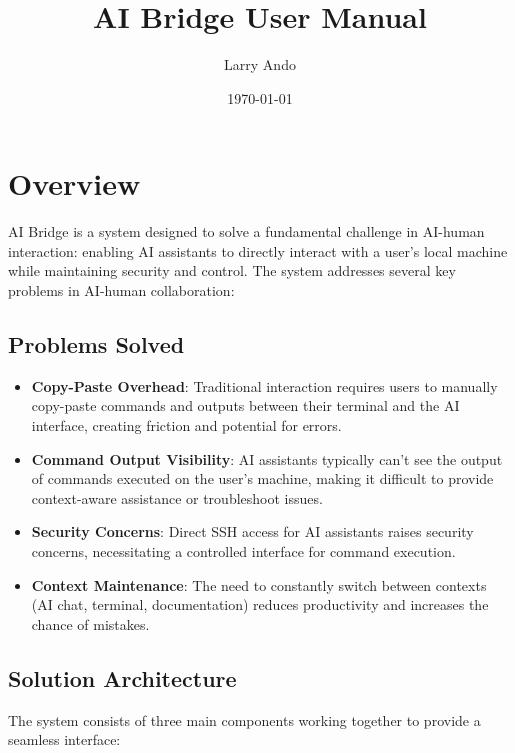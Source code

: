 \documentclass{article}
\title{AI Bridge User Manual}
\author{Larry Ando}
\date{\today}
\begin{document}
\maketitle

\section{Overview}
AI Bridge is a system designed to solve a fundamental challenge in AI-human interaction: enabling AI assistants to directly interact with a user's local machine while maintaining security and control. The system addresses several key problems in AI-human collaboration:

\subsection{Problems Solved}
\begin{itemize}
    \item \textbf{Copy-Paste Overhead}: Traditional interaction requires users to manually copy-paste commands and outputs between their terminal and the AI interface, creating friction and potential for errors.
    
    \item \textbf{Command Output Visibility}: AI assistants typically can't see the output of commands executed on the user's machine, making it difficult to provide context-aware assistance or troubleshoot issues.
    
    \item \textbf{Security Concerns}: Direct SSH access for AI assistants raises security concerns, necessitating a controlled interface for command execution.
    
    \item \textbf{Context Maintenance}: The need to constantly switch between contexts (AI chat, terminal, documentation) reduces productivity and increases the chance of mistakes.
\end{itemize}

\subsection{Solution Architecture}
The system consists of three main components working together to provide a seamless interface:
\end{document}
